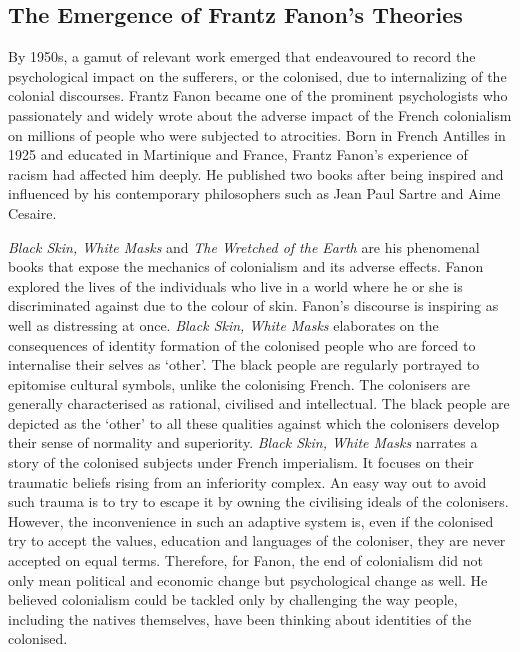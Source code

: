 \subsection{The Emergence of Frantz Fanon’s Theories}

By 1950s, a gamut of relevant work emerged that endeavoured to record the psychological impact on the sufferers, or the colonised, due to internalizing of the colonial discourses. Frantz Fanon became one of the prominent psychologists who passionately and widely wrote about the adverse impact of the French colonialism on millions of people who were subjected to atrocities. Born in French Antilles in 1925 and educated in Martinique and France, Frantz Fanon’s experience of racism had affected him deeply. He published two books after being inspired and influenced by his contemporary philosophers such as \linebreak Jean Paul Sartre and Aime Cesaire. 

\emph{Black Skin, White Masks} and \emph{The Wretched of the Earth} are his phenomenal books that expose the mechanics of colonialism and its adverse effects. Fanon explored the lives of the individuals who live in a world where he or she is discriminated against due to the colour of skin. Fanon’s discourse is inspiring as well as distressing at once. \emph{Black Skin, White Masks} elaborates on the consequences of identity formation of the colonised people who are forced to internalise their selves as ‘other’. The black people are regularly portrayed to epitomise cultural symbols, unlike the colonising French. The colonisers are generally characterised as rational, civilised and intellectual. The black people are depicted as the ‘other’ to all these qualities against which the colonisers develop their sense of normality and superiority. \emph{Black Skin, White Masks} narrates a story of the colonised subjects under French imperialism. It focuses on their traumatic beliefs rising from an inferiority complex. An easy way out to avoid such trauma is to try to escape it by owning the civilising ideals of the colonisers. However, the inconvenience in such an adaptive system is, even if the colonised try to accept the values, education and languages of the coloniser, they are never accepted on equal terms. Therefore, for Fanon, the end of colonialism did not only mean political and economic change but psychological change as well. He believed colonialism could be tackled only by challenging the way people, including the natives themselves, have been thinking about identities of the colonised. 

